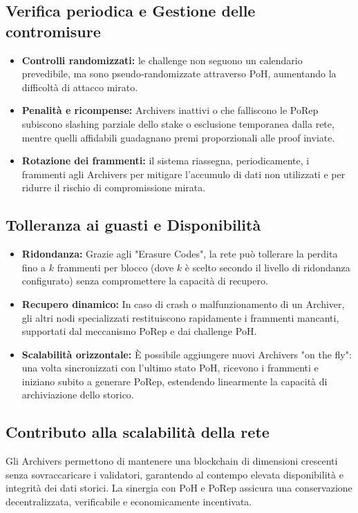\documentclass[a4paper,12pt]{report}
\begin{document}
	\subsection{Verifica periodica e Gestione delle contromisure}
	\begin{itemize}
		\item \textbf{Controlli randomizzati:} le challenge non seguono un calendario prevedibile, ma sono pseudo‑randomizzate attraverso PoH, aumentando la difficoltà di attacco mirato.
		\item \textbf{Penalità e ricompense:} Archivers inattivi o che falliscono le PoRep subiscono slashing parziale dello stake o esclusione temporanea dalla rete, mentre quelli affidabili guadagnano premi proporzionali alle proof inviate.
		\item \textbf{Rotazione dei frammenti:} il sistema riassegna, periodicamente, i frammenti agli Archivers per mitigare l’accumulo di dati non utilizzati e per ridurre il rischio di compromissione mirata.
	\end{itemize}
	
	\subsection{Tolleranza ai guasti e Disponibilità}
	\begin{itemize}
		\item \textbf{Ridondanza:} Grazie agli "Erasure Codes", la rete può tollerare la perdita fino a \(k\) frammenti per blocco (dove \(k\) è scelto secondo il livello di ridondanza configurato) senza compromettere la capacità di recupero.
		\item \textbf{Recupero dinamico:} In caso di crash o malfunzionamento di un Archiver, gli altri nodi specializzati restituiscono rapidamente i frammenti mancanti, supportati dal meccanismo PoRep e dai challenge PoH.
		\item \textbf{Scalabilità orizzontale:} È possibile aggiungere nuovi Archivers "on the fly": una volta sincronizzati con l’ultimo stato PoH, ricevono i frammenti e iniziano subito a generare PoRep, estendendo linearmente la capacità di archiviazione dello storico.
	\end{itemize}
	
	\subsection{Contributo alla scalabilità della rete}
	Gli Archivers permettono di mantenere una blockchain di dimensioni crescenti senza sovraccaricare i validatori, garantendo al contempo elevata disponibilità e integrità dei dati storici. La sinergia con PoH e PoRep assicura una conservazione decentralizzata, verificabile e economicamente incentivata.
	
\end{document}
